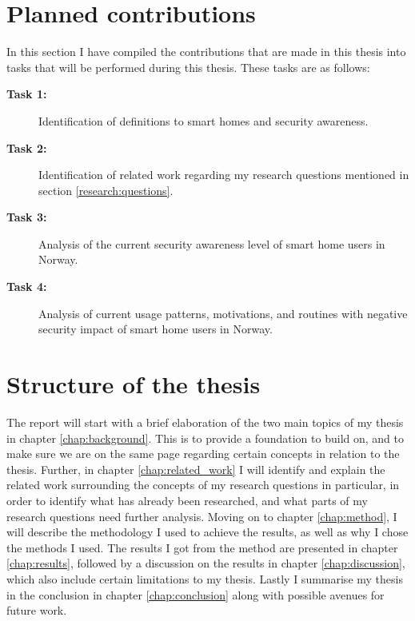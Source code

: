 \section{Planned contributions}
In this section I have compiled the contributions that are made in this thesis into tasks that will be performed during this thesis. These tasks are as follows:
\begin{description}
    \item[\textbf{Task 1:}] Identification of definitions to smart homes and security awareness. 
    \item[\textbf{Task 2:}] Identification of related work regarding my research questions mentioned in section \ref{research:questions}. 
    \item[\textbf{Task 3:}] Analysis of the current security awareness level of smart home users in Norway.
    \item[\textbf{Task 4:}] Analysis of current usage patterns, motivations, and routines with negative security impact of smart home users in Norway.
\end{description}

\section{Structure of the thesis}
The report will start with a brief elaboration of the two main topics of my thesis in chapter \ref{chap:background}. This is to provide a foundation to build on, and to make sure we are on the same page regarding certain concepts in relation to the thesis. Further, in chapter \ref{chap:related_work} I will identify and explain the related work surrounding the concepts of my research questions in particular, in order to identify what has already been researched, and what parts of my research questions need further analysis. Moving on to chapter \ref{chap:method}, I will describe the methodology I used to achieve the results, as well as why I chose the methods I used. The results I got from the method are presented in chapter \ref{chap:results}, followed by a discussion on the results in chapter \ref{chap:discussion}, which also include certain limitations to my thesis. Lastly I summarise my thesis in the conclusion in chapter \ref{chap:conclusion} along with possible avenues for future work. 

